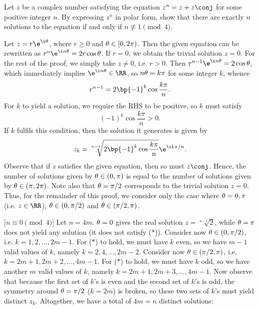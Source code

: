 \begin{problem}
    Let $z$ be a complex number satisfying the equation $z^n = z + z\conj$ for some positive integer $n$. By expressing $z^n$ in polar form, show that there are exactly $n$ solutions to the equation if and only if $n \not\equiv 1 \pmod{4}$.
\end{problem}
\begin{solution}
    Let $z = r\e^{\i \t}$, where $r \geq 0$ and $\theta \in [0, 2\pi)$. Then the given equation can be rewritten as $r^n \e^{\i n \t} = 2 r \cos \t$. If $r = 0$, we obtain the trivial solution $z = 0$. For the rest of the proof, we simply take $z \neq 0$, i.e. $r > 0$. Then $r^{n-1} \e^{\i n \t} = 2 \cos \t$, which immediately implies $\e^{\i n \t} \in \RR$, so $n \theta = k \pi$ for some integer $k$, whence \[r^{n-1} = 2 \bp{-1}^k \cos \frac{k \pi}{n}.\] For $k$ to yield a solution, we require the RHS to be positive, so $k$ must satisfy \[(-1)^k \cos \frac{k \pi}{n} > 0. \tag{$\ast$}\] If $k$ fulfils this condition, then the solution it generates is given by \[z_k = \sqrt[n-1]{2 \bp{-1}^k \cos \frac{k\pi}{n}} \e^{\i k \pi / n}.\] Observe that if $z$ satisfies the given equation, then so must $z\conj$. Hence, the number of solutions given by $\theta \in (0, \pi)$ is equal to the number of solutions given by $\theta \in (\pi, 2\pi)$. Note also that $\theta = \pi/2$ corresponds to the trivial solution $z = 0$. Thus, for the remainder of this proof, we consider only the case where $\theta = 0, \pi$ (i.e. $z \in \RR$), $\theta \in (0, \pi/2)$ and $\theta \in (\pi/2, \pi)$.

    [$n \equiv 0 \pmod{4}$] Let $n = 4m$. $\theta = 0$ gives the real solution $z = \sqrt[n-1]{2}$, while $\theta = \pi$ does not yield any solution (it does not satisfy ($\ast$)). Consider now $\theta \in (0, \pi/2)$, i.e. $k = 1, 2, \dots, 2m-1$. For ($\ast$) to hold, we must have $k$ even, so we have $m-1$ valid values of $k$, namely $k = 2, 4, \dots, 2m-2$. Consider now $\theta \in (\pi/2, \pi)$, i.e. $k = 2m + 1, 2m+2, \dots, 4m-1$. For ($\ast$) to hold, we must have $k$ odd, so we have another $m$ valid values of $k$, namely $k = 2m+1, 2m+3, \dots, 4m-1$. Now observe that because the first set of $k$'s is even and the second set of $k$'s is odd, the symmetry around $\theta = \pi/2$ ($k = 2m$) is broken, so these two sets of $k$'s must yield distinct $z_k$. Altogether, we have a total of $4m = n$ distinct solutions:


\end{solution}
